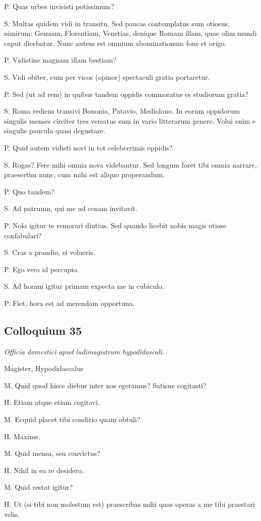 \documentclass{article}
\begin{document}
P. Quas urbes invisisti potissimum?

S. Multas quidem vidi in transitu. Sed paucas contemplatus sum otiosus, nimirum: Genuam, Florentiam, Venetias, denique Romam illam, quae olim mundi caput dicebatur. Nunc autem est omnium abominationum fons et origo.

P. Vidistine magnam illam bestiam?

S. Vidi obiter, cum per vicos (opinor) spectaculi gratia portaretur.

P. Sed (ut ad rem) in quibus tandem oppidis commoratus es studiorum gratia?

S. Roma rediens transivi Bononia, Patavio, Mediolano. In eorum oppidorum singulis menses circiter tres versatus sum in vario litterarum genere. Volui enim e singulis paucula quasi degustare.

P. Quid autem vidisti novi in tot celeberrimis oppidis?

S. Rogas? Fere mihi omnia nova videbantur. Sed longum foret tibi omnia narrare, praesertim nunc, cum mihi est aliquo properandum.

P. Quo tandem?

S. Ad patruum, qui me ad cenam invitavit.

P. Nolo igitur te remorari diutius. Sed quando licebit nobis magis otiose confabulari?

S. Cras a prandio, si volueris.

P. Ego vero id percupio.

S. Ad horam igitur primam expecta me in cubiculo.

P. Fiet, hora est ad merendam opportuna.

\subsection{Colloquium 35}
\emph{Officia domestici apud ludimagistrum hypodidascali.}

Magister, Hypodidascalus

M. Quid quod hisce diebus inter nos egeramus? Satisne cogitasti?

H. Etiam atque etiam cogitavi.

M. Ecquid placet tibi conditio quam obtuli?

H. Maxime.

M. Quid mensa, seu convictus?

H. Nihil in ea re desidero.

M. Quid restat igitur?

H. Ut (si tibi non molestum est) praescribas mihi quas operas a me tibi praestari velis.
\end{document}
